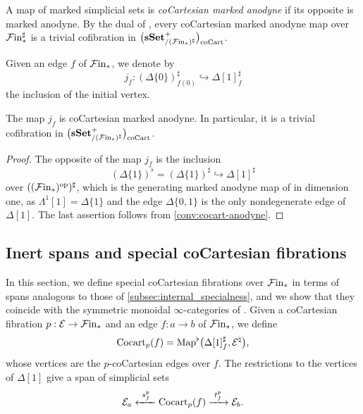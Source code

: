 \documentclass[10pt,reqno]{amsart}
\begin{document}
\begin{convention}
\label{conv:cocart-anodyne}
A map of marked simplicial sets is \emph{coCartesian marked anodyne}
if its opposite is marked anodyne. By the dual of
\cite[Remark~3.1.3.4]{lurie2009higher}, every coCartesian marked
anodyne map over $\mathcal{F}\mathrm{in}_*^\sharp$ is a trivial cofibration in
$\bigl(\mathbf{sSet}^+_{/(\mathcal{F}\mathrm{in}_*)^\sharp}\bigr)_{\mathrm{coCart}}$.
\end{convention}

Given an edge $f$ of $\mathcal{F}\mathrm{in}_*$, we denote by
\begin{equation}
\label{eq:initial-vertex-inclusion}
j_f:(\Delta\{0\})^\sharp_{f(0)}
\hookrightarrow\Delta[1]^\sharp_f
\end{equation}
the inclusion of the initial vertex.

\begin{lemma}
\label{lem:initial-vertex-cocart-anodyne}
The map $j_f$ is coCartesian marked anodyne. In particular, it is a
trivial cofibration in $\bigl(\mathbf{sSet}^+_{/(\mathcal{F}\mathrm{in}_*)^\sharp}\bigr)_{\mathrm{coCart}}$.
\end{lemma}

\begin{proof}
The opposite of the map $j_f$ is the inclusion
\[
(\Delta\{1\})^\flat=(\Delta\{1\})^\sharp
\hookrightarrow\Delta[1]^\sharp
\]
over $((\mathcal{F}\mathrm{in}_*)^{\mathrm{op}})^\sharp$, which is the generating
marked anodyne map of
\cite[Definition~3.1.1.1\textup{(2)}]{lurie2009higher} in dimension
one, as $\Lambda^1[1]=\Delta\{1\}$ and the edge $\Delta\{0,1\}$ is
the only nondegenerate edge of $\Delta[1]$. The last assertion
follows from \cref{conv:cocart-anodyne}.
\end{proof}

\subsection{Inert spans and special coCartesian fibrations}
\label{subsec:enriched_specialness}

In this section, we define special coCartesian fibrations over
$\mathcal{F}\mathrm{in}_*$ in terms of spans analogous to those of
\cref{subsec:internal_specialness}, and we show that they coincide
with the symmetric monoidal $\infty$-categories of
\cite[Definition~2.0.0.7]{LurieHA}. Given a coCartesian fibration
$p:\mathcal E\to\mathcal{F}\mathrm{in}_*$ and an edge $f:a\to b$ of $\mathcal{F}\mathrm{in}_*$, we
define
\[
\operatorname{Cocart}_p(f)=\operatorname{Map}^\flat
\bigl(\Delta[1]^\sharp_f,\mathcal E^\natural\bigr),
\]
whose vertices are the $p$-coCartesian edges over $f$. The
restrictions to the vertices of $\Delta[1]$ give a span of
simplicial sets
\begin{equation}
\label{eq:single_cocartesian_span}
\mathcal E_a\xleftarrow{\ s_f^p\ }
\operatorname{Cocart}_p(f)\xrightarrow{\ t_f^p\ }\mathcal E_b.
\end{equation}
\end{document}
